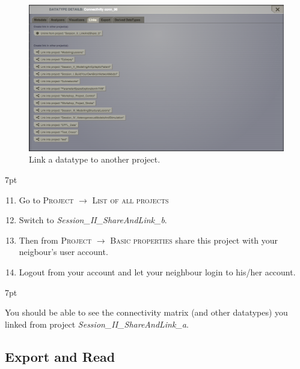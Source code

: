 \documentclass{tufte-handout}
\newenvironment{formal}{%
  \def\FrameCommand{%
    \hspace{1pt}%
    {\color{DarkBlue}\vrule width 2pt}%
    {\color{formalshade}\vrule width 4pt}%
    \colorbox{formalshade}%
  }%
  \MakeFramed{\advance\hsize-\width\FrameRestore}%
  \noindent\hspace{-4.55pt}%
  \begin{adjustwidth}{}{7pt}%
  \vspace{2pt}\vspace{2pt}%
}
{%
  \vspace{2pt}\end{adjustwidth}\endMakeFramed%
}
\newenvironment{blah}{%
  \def\FrameCommand{%
    \hspace{1pt}%
    {\color{DarkOrange}\vrule width 2pt}%
    {\color{PeachPuff}\vrule width 4pt}%
    \colorbox{PeachPuff}%
  }%
  \MakeFramed{\advance\hsize-\width\FrameRestore}%
  \noindent\hspace{-4.55pt}%
  \begin{adjustwidth}{}{7pt}%
  \vspace{2pt}\vspace{2pt}%
}
{%
  \vspace{2pt}\end{adjustwidth}\endMakeFramed%
}
\begin{document}
\begin{figure}[h]
  \includegraphics[width=\linewidth]{Handout_UI_LinkAndShare_LinkedProject}%
  \caption{Link a datatype to another project.}%
  \label{fig:linkproject}%
\end{figure}

\begin{formal}
  \begin{enumerate}[resume]
    \setcounter{enumi}{10}
    \item Go to \textsc{Project} $\rightarrow$ \textsc{List of all projects}
    \item Switch to \textit{Session\_II\_ShareAndLink\_b}.
    \item Then from \textsc{Project} $\rightarrow$ \textsc{Basic properties} 
share this project with your neigbour's user account. 
    \item Logout from your account and let your neighbour login to his/her account. 
  \end{enumerate}
\end{formal} 

\begin{blah}
You should be able to see the connectivity matrix (and other datatypes) you linked
from project \textit{Session\_II\_ShareAndLink\_a}.
\end{blah}

\subsection{Export and Read}\label{sec:link_and_share}
\end{document}
